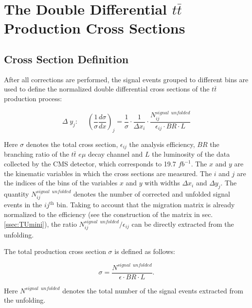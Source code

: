 \section{The Double Differential $t\bar{t}$ Production Cross Sections}

\subsection{Cross Section Definition}\label{ssec:xsec_def}

After all corrections are performed, the signal events grouped to different bins are used to define the normalized double differential cross sections
of the $t\bar{t}$ production process:

\begin{equation}\label{eq:ddxsecdef}
 \Delta\;y_{j}: \:\:\:\:\:\:(\frac{1}{\sigma} \frac{d\sigma}{dx})_{j} = \frac{1}{\sigma} \cdot \frac{1}{\Delta x_{i}} \cdot \frac{N^{signal\:\;unfolded}_{ij}}{\epsilon_{ij} \cdot BR \cdot L}
\end{equation}

Here $\sigma$ denotes the total cross section, $\epsilon_{ij}$ the analysis efficiency, $BR$ the branching ratio of the $t\bar{t}$ $e\mu$ decay channel and $L$ the luminosity
of the data collected by the CMS detector, which corresponds to 19.7 $fb^{-1}$. The $x$ and $y$ are the kinematic variables in which the cross sections 
are measured. The $i$ and $j$ are the indices of the bins of the variables $x$ and $y$ with widths $\Delta x_{i}$ and $\Delta y_{j}$.
The quantity $N^{signal\:\;unfolded}_{ij}$ denotes the number of corrected and unfolded signal events in the $ij^{\textrm{th}}$ bin.
Taking to account that the migration matrix is already normalized to the efficiency (see the construction of the matrix in sec. \ref{ssec:TUmini}), 
the ratio $N^{signal\:\;unfolded}_{ij} / \epsilon_{ij}$ can be directly extracted from the unfolding.

The total production cross section $\sigma$ is defined as follows:

\begin{equation}
 \sigma = \frac{N^{signal\;\:unfolded}}{\epsilon \cdot BR \cdot L}.
\end{equation}

Here $N^{signal\;\:unfolded}$ denotes the total number of the signal events extracted from the unfolding. 

